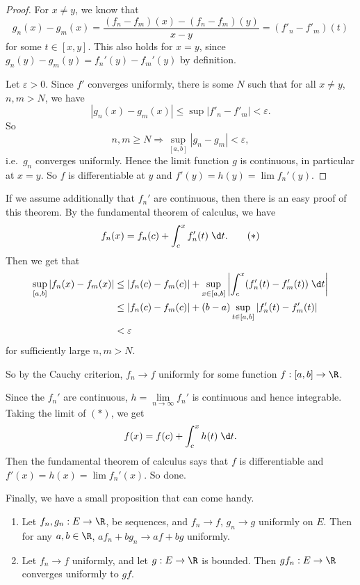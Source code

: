 \documentclass[a4paper]{article}
\begin{document}
\begin{proof}
  For $x \not = y$, we know that
  \[
    g_n(x) - g_m(x) = \frac{(f_n - f_m)(x) - (f_n - f_m)(y)}{x - y} = (f'_n - f'_m)(t)
  \]
  for some $t \in [x, y]$. This also holds for $x = y$, since $g_n(y) - g_m(y) = f_n'(y) - f_m'(y)$ by definition.

  Let $\varepsilon > 0$. Since $f'$ converges uniformly, there is some $N$ such that for all $x\not= y$, $n, m > N$, we have
  \[
    |g_n(x) - g_m(x)| \leq \sup |f'_n - f'_m| < \varepsilon.
  \]
   So
  \[
    n, m\geq N \Rightarrow \sup_{[a, b]}|g_n - g_m| < \varepsilon,
  \]
  i.e.\ $g_n$ converges uniformly. Hence the limit function $g$ is continuous, in particular at $x = y$. So $f$ is differentiable at $y$ and $f'(y) = h(y) = \lim f_n'(y)$.
\end{proof}

If we assume additionally that $f_n'$ are continuous, then there is an easy proof of this theorem. By the fundamental theorem of calculus, we have
\[
  f_n(x) = f_n(c) + \int_c^x f_n'(t)\;\d t.\tag{$*$}
\]
Then we get that
\begin{align*}
  \sup_{[a, b]}|f_n(x) - f_m(x)| &\leq |f_n(c) - f_m(c)| + \sup_{x\in [a, b]}\left|\int_c^x (f_n'(t) - f_m'(t))\;\d t\right|\\
  &\leq |f_n(c) - f_m(c)| + (b - a)\sup_{t\in [a, b]}|f_n'(t) - f_m'(t)|\\
  &< \varepsilon
\end{align*}
for sufficiently large $n, m> N$.

So by the Cauchy criterion, $f_n \to f$ uniformly for some function $f: [a, b] \to \R$.

Since the $f_n'$ are continuous, $h = \lim\limits_{n\to \infty} f_n'$ is continuous and hence integrable. Taking the limit of $(*)$, we get
\[
  f(x) = f(c) + \int_c^x h(t)\;\d t.
\]
Then the fundamental theorem of calculus says that $f$ is differentiable and $f'(x) = h(x) = \lim f_n'(x)$. So done.

Finally, we have a small proposition that can come handy.
\begin{prop}\leavevmode
  \begin{enumerate}
    \item Let $f_n, g_n: E\to \R$, be sequences, and $f_n \to f$, $g_n \to g$ uniformly on $E$. Then for any $a, b\in \R$, $af_n + bg_n \to af + bg$ uniformly.
    \item Let $f_n \to f$ uniformly, and let $g: E\to \R$ is bounded. Then $gf_n: E\to \R$ converges uniformly to $gf$.
  \end{enumerate}
\end{prop}
\end{document}
